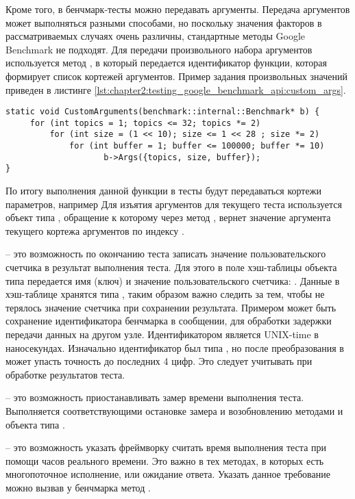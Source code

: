 \begin{description}[noitemsep]
	Кроме того, в бенчмарк-тесты можно передавать аргументы. Передача аргументов может выполняться разными способами, но поскольку значения факторов в рассматриваемых случаях очень различны, стандартные методы Google Benchmark не подходят. Для передачи произвольного набора аргументов используется метод , в который передается идентификатор функции, которая формирует список кортежей аргументов. Пример задания произвольных значений приведен в листинге \ref{lst:chapter2:testing_google_benchmark_api:custom_args}.
	\begin{lstlisting}[label=lst:chapter2:testing_google_benchmark_api:custom_args, caption={Описание функции, формирующей список кортежей аргументов для бенчмарк-теста}]
static void CustomArguments(benchmark::internal::Benchmark* b) {
     for (int topics = 1; topics <= 32; topics *= 2)
         for (int size = (1 << 10); size <= 1 << 28 ; size *= 2)
             for (int buffer = 1; buffer <= 100000; buffer *= 10)
                    b->Args({topics, size, buffer});
}
	\end{lstlisting}
	По итогу выполнения данной функции в тесты будут передаваться кортежи параметров, например  \etc{} Для изъятия аргументов для текущего теста используется объект типа , обращение к которому через метод , вернет значение аргумента текущего кортежа аргументов по индексу . 
	
	\item [Пользовательские счетчики] -- это возможность по окончанию теста записать значение пользовательского счетчика в результат выполнения теста. Для этого в поле хэш-таблицы  объекта типа  передается имя (ключ) и значение пользовательского счетчика: . Данные в хэш-таблице хранятся типа , таким образом важно следить за тем, чтобы не терялось значение счетчика при сохранении результата. Примером может быть сохранение идентификатора бенчмарка в сообщении, для обработки задержки передачи данных на другом узле. Идентификатором является UNIX-time в наносекундах. Изначально идентификатор был типа , но после преобразования в  может упасть точность до последних 4 цифр. Это следует учитывать при обработке результатов теста.
	
	\item [Управление временем] -- это возможность приостанавливать замер времени выполнения теста. Выполняется соответствующими остановке замера и возобновлению методами  и  объекта типа .
	
	\item [Указание способа вычисления времени] -- это возможность указать фреймворку считать время выполнения теста при помощи часов реального времени. Это важно в тех методах, в которых есть многопоточное исполнение, или ожидание ответа. Указать данное требование можно вызвав у бенчмарка метод . 
\end{description}

